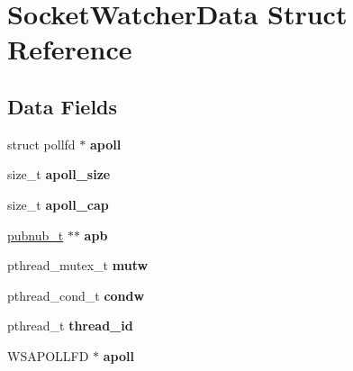 \hypertarget{structSocketWatcherData}{\section{Socket\-Watcher\-Data Struct Reference}
\label{structSocketWatcherData}
}
\subsection*{Data Fields}
\begin{DoxyCompactItemize}
\item 
\hypertarget{structSocketWatcherData_ab1b665027dc3f01baecd010a61a73f0f}{struct pollfd $\ast$ {\bfseries apoll}}\label{structSocketWatcherData_ab1b665027dc3f01baecd010a61a73f0f}

\item 
\hypertarget{structSocketWatcherData_a1377134cfc86ad59665de27db8edf321}{size\-\_\-t {\bfseries apoll\-\_\-size}}\label{structSocketWatcherData_a1377134cfc86ad59665de27db8edf321}

\item 
\hypertarget{structSocketWatcherData_a13e5230b2f7f1e767e9bac41a04e7675}{size\-\_\-t {\bfseries apoll\-\_\-cap}}\label{structSocketWatcherData_a13e5230b2f7f1e767e9bac41a04e7675}

\item 
\hypertarget{structSocketWatcherData_a8eba78490fb09424b1ed9baf72c2e563}{\hyperlink{structpubnub}{pubnub\-\_\-t} $\ast$$\ast$ {\bfseries apb}}\label{structSocketWatcherData_a8eba78490fb09424b1ed9baf72c2e563}

\item 
\hypertarget{structSocketWatcherData_a58a8024d1a041c9c5d065b28967d6bb7}{pthread\-\_\-mutex\-\_\-t {\bfseries mutw}}\label{structSocketWatcherData_a58a8024d1a041c9c5d065b28967d6bb7}

\item 
\hypertarget{structSocketWatcherData_accdedc80d3240f32577c242dd0cd4eea}{pthread\-\_\-cond\-\_\-t {\bfseries condw}}\label{structSocketWatcherData_accdedc80d3240f32577c242dd0cd4eea}

\item 
\hypertarget{structSocketWatcherData_ab252d261ba7f0b5414691403e511e02e}{pthread\-\_\-t {\bfseries thread\-\_\-id}}\label{structSocketWatcherData_ab252d261ba7f0b5414691403e511e02e}

\item 
\hypertarget{structSocketWatcherData_a1e0e12f0b8f8d53a762ebbdeef3a7b61}{W\-S\-A\-P\-O\-L\-L\-F\-D $\ast$ {\bfseries apoll}}\label{structSocketWatcherData_a1e0e12f0b8f8d53a762ebbdeef3a7b61}


\end{DoxyCompactItemize}
